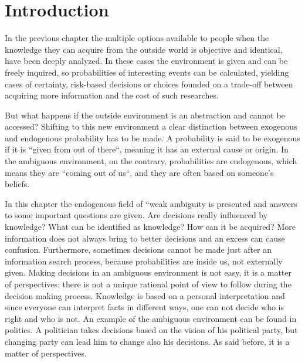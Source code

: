 \section{Introduction}
In the previous chapter the multiple options available to people when the knowledge they can acquire from the outside world is objective and identical, have been deeply analyzed. In these cases the environment is given and can be freely inquired, so probabilities of interesting events can be calculated, yielding cases of certainty, risk-based decisions or choices founded on a trade-off between acquiring more information and the cost of such researches.

But what happens if the outside environment is an abstraction and cannot be accessed? Shifting to this new environment a clear distinction between exogenous and endogenous probability has to be made. A probability is said to be exogenous if it is ``given from out of there``, meaning it has an external cause or origin. In the ambiguous environment, on the contrary, probabilities are endogenous, which means they are ``coming out of us``, and they are often based on someone’s beliefs.

In this chapter the endogenous field of ``weak ambiguity is presented and answers to some important questions are given. Are decisions really influenced by knowledge? What can be identified as knowledge? How can it be acquired? More information does not always bring to better decisions and an excess can cause confusion. Furthermore, sometimes decisions cannot be made just after an information search process, because probabilities are inside us, not externally given. Making decisions in an ambiguous environment is not easy, it is a matter of perspectives: there is not a unique rational point of view to follow during the decision making process.
Knowledge is based on a personal interpretation and since everyone can interpret facts in different ways, one can not decide who is right and who is not. An example of the ambiguous environment can be found in politics. A politician takes decisions based on the vision of his political party, but changing party can lead him to change also his decisions. As said before, it is a matter of perspectives.

